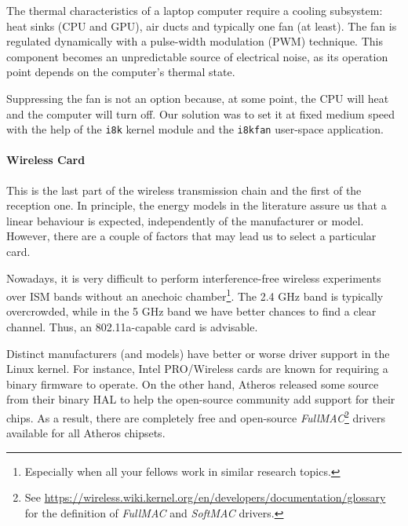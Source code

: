 \documentclass[twoside,nohyper]{tufte-book}
\providecommand{\tightlist}{%
  \setlength{\itemsep}{0pt}\setlength{\parskip}{0pt}}
\theoremstyle{definition}
\theoremstyle{definition}
\theoremstyle{definition}
\theoremstyle{remark}
\begin{document}
The thermal characteristics of a laptop computer require a cooling
subsystem: heat sinks (CPU and GPU), air ducts and typically one fan (at
least). The fan is regulated dynamically with a pulse-width modulation
(PWM) technique. This component becomes an unpredictable source of
electrical noise, as its operation point depends on the computer's
thermal state.

Suppressing the fan is not an option because, at some point, the CPU
will heat and the computer will turn off. Our solution was to set it at
fixed medium speed with the help of the \texttt{i8k} kernel module and
the \texttt{i8kfan} user-space application.

\paragraph{Wireless Card}\label{wireless-card}

This is the last part of the wireless transmission chain and the first
of the reception one. In principle, the energy models in the literature
assure us that a linear behaviour is expected, independently of the
manufacturer or model. However, there are a couple of factors that may
lead us to select a particular card.

\begin{description}
\tightlist
\item[Supported capabilities]
Nowadays, it is very difficult to perform interference-free wireless
experiments over ISM bands without an anechoic chamber\footnote{Especially
  when all your fellows work in similar research topics.}. The 2.4 GHz
band is typically overcrowded, while in the 5 GHz band we have better
chances to find a clear channel. Thus, an 802.11a-capable card is
advisable.
\item[Manufacturer]
Distinct manufacturers (and models) have better or worse driver support
in the Linux kernel. For instance, Intel PRO/Wireless cards are known
for requiring a binary firmware to operate. On the other hand, Atheros
released some source from their binary HAL to help the open-source
community add support for their chips. As a result, there are completely
free and open-source \emph{FullMAC}\footnote{See
  \url{https://wireless.wiki.kernel.org/en/developers/documentation/glossary}
  for the definition of \emph{FullMAC} and \emph{SoftMAC} drivers.}
drivers available for all Atheros chipsets.
\end{description}
\end{document}
